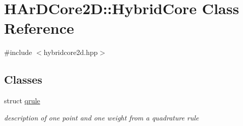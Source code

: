 \hypertarget{classHArDCore2D_1_1HybridCore}{}\section{H\+Ar\+D\+Core2D\+:\+:Hybrid\+Core Class Reference}
\label{classHArDCore2D_1_1HybridCore}


{\ttfamily \#include $<$hybridcore2d.\+hpp$>$}

\subsection*{Classes}
\begin{DoxyCompactItemize}
\item 
struct \hyperlink{structHArDCore2D_1_1HybridCore_1_1qrule}{qrule}
\begin{DoxyCompactList}\small\item\em description of one point and one weight from a quadrature rule \end{DoxyCompactList}\end{DoxyCompactItemize}
